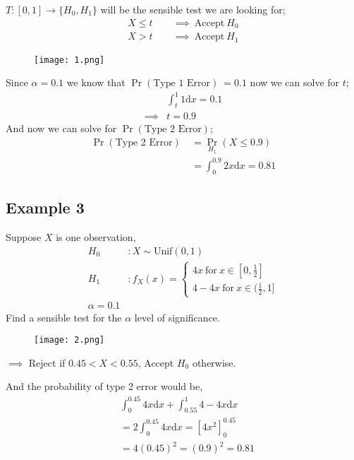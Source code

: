 \documentclass[12pt,a4paper,fleqn]{article}
\begin{document}
\(T : [0,1] \to \{H_{0},H_{1}\} \)  will be the sensible test we are looking for;
 \begin{align*}
    X\leq t \qquad \implies \ \text{Accept} \ H_{0} \\
    X> t \qquad \implies \ \text{Accept} \ H_{1}
\end{align*}
\begin{figure}[ht]
    \centering
    \texttt{[image: 1.png]}
\end{figure}

Since \(\alpha=0.1\) we know that \(\Pr\left( \text{Type 1 Error} \right) \ = 0.1 \) now we can solve for \(t\);
 \begin{align*}
    &\int_{t}^{1} 1 \mathrm{d}x = 0.1 \\
    \implies &t = 0.9
\end{align*}
And now we can solve for \(\Pr\left( \text{Type 2 Error} \right) \);
 \begin{align*}
    \Pr\left( \text{Type 2 Error} \right) \ &= \Pr_{H_{1}}(X \leq 0.9) \\
    &= \int_{0}^{0.9} 2x \mathrm{d}x = 0.81 
\end{align*}  
\pagebreak
 \subsection{Example 3} 
Suppose \(X\) is one observation,
\begin{align*}
    H_{0} &: X \sim \text{Unif}(0,1)\\
    H_{1} &: f_{X}(x)=\begin{cases} 4x \ \text{for} \ x \in [0,\frac{1}{2}]\\
        4-4x  \ \text{for} \ x \in (\frac{1}{2},1] 
    \end{cases}\\
    \alpha = 0.1    
\end{align*} 
Find a sensible test for the \(\alpha \) level of significance.

\begin{figure}[ht]
    \centering
    \texttt{[image: 2.png]}
\end{figure}

\( \implies \) Reject if \(0.45<X<0.55\), Accept \(H_{0}\) otherwise.  

And the probability of type 2 error would be,
 \begin{align*}
    &\int_{0}^{0.45} 4x \mathrm{d}x + \int_{0.55}^{1} 4-4x \mathrm{d}x \\
    &= 2 \int_{0}^{0.45} 4x \mathrm{d}x = {\left[ 4x^2 \right]}_{0}^{0.45}\\
    &=4{(0.45)}^2 = {(0.9)}^2 = 0.81
\end{align*}
\pagebreak
\end{document}
